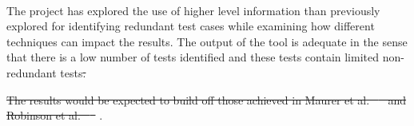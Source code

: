 \documentclass[11pt
              , a4paper
              , twoside
              , openright
              ]{report}
\providecommand{\DIFdel}[1]{{\protect\color{red}\sout{#1}}}                      %
\providecommand{\DIFaddbegin}{} %
\providecommand{\DIFaddend}{} %
\providecommand{\DIFdelbegin}{} %
\providecommand{\DIFdelend}{} %
\begin{document}
\DIFdelend \DIFaddbegin \paragraph{}
\DIFaddend The project has explored the use of higher level information than previously explored for identifying redundant test cases while examining how different techniques can impact the results. The output of the tool is adequate in the sense that there is a low number of tests identified and these tests contain limited non-redundant tests\DIFdelbegin \DIFdel{. 
}%

\DIFdel{The results would be expected to build off those achieved in Maurer et al. \mbox{%
\cite{li2008static}
}%
and Robinson et al. \mbox{%
\cite{koochakzadeh2009test}
}%
}\DIFdelend . 
\end{document}
